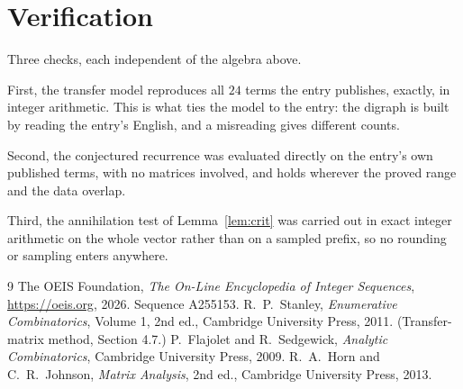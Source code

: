 \documentclass[11pt,a4paper]{article}
\theoremstyle{plain}
\theoremstyle{definition}
\begin{document}
\section{Verification}

Three checks, each independent of the algebra above.

First, the transfer model reproduces all $24$ terms the entry publishes, exactly, in
integer arithmetic. This is what ties the model to the entry: the digraph is built by reading
the entry's English, and a misreading gives different counts.

Second, the conjectured recurrence was evaluated directly on the entry's own published terms,
with no matrices involved, and holds wherever the proved range and the data overlap.

Third, the annihilation test of Lemma~\ref{lem:crit} was carried out in exact integer
arithmetic on the whole vector rather than on a sampled prefix, so no rounding or sampling
enters anywhere.

\begin{thebibliography}{9}
 The OEIS Foundation, \emph{The On-Line Encyclopedia of Integer
Sequences}, \url{https://oeis.org}, 2026. Sequence A255153.
 R.~P.~Stanley, \emph{Enumerative Combinatorics}, Volume 1, 2nd ed.,
Cambridge University Press, 2011. (Transfer-matrix method, Section 4.7.)
 P.~Flajolet and R.~Sedgewick, \emph{Analytic Combinatorics}, Cambridge
University Press, 2009.
 R.~A.~Horn and C.~R.~Johnson, \emph{Matrix Analysis}, 2nd ed., Cambridge
University Press, 2013.
\end{thebibliography}
\end{document}
